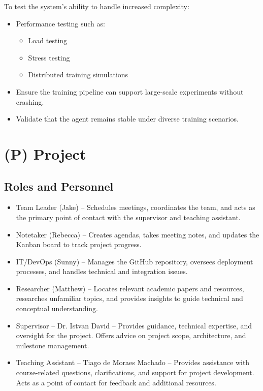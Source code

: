 \documentclass{article}
\begin{document}
To test the system’s ability to handle increased complexity:
\begin{itemize}
    \item Performance testing such as:
    \begin{itemize}
        \item Load testing
        \item Stress testing
        \item Distributed training simulations
    \end{itemize}
    \item Ensure the training pipeline can support large-scale experiments without crashing.
    \item Validate that the agent remains stable under diverse training scenarios.
\end{itemize}
\newpage{}


\section*{(P) Project}\label{sec:srs_project}
\renewcommand{\thesubsection}{P.\arabic{subsection}}
\setcounter{subsection}{0}

\subsection{Roles and Personnel}\label{subsec:roles}
\begin{itemize}
    \item {Team Leader (Jake)} – Schedules meetings, coordinates the team, and acts as the primary point of contact with the supervisor and teaching assistant.
    \item {Notetaker (Rebecca)} – Creates agendas, takes meeting notes, and updates the Kanban board to track project progress.
    \item {IT/DevOps (Sunny)} – Manages the GitHub repository, oversees deployment processes, and handles technical and integration issues.
    \item {Researcher (Matthew)} – Locates relevant academic papers and resources, researches unfamiliar topics, and provides insights to guide technical and conceptual understanding.
    \item {Supervisor – Dr. Istvan David} – Provides guidance, technical expertise, and oversight for the project. Offers advice on project scope, architecture, and milestone management.
    \item {Teaching Assistant – Tiago de Moraes Machado} – Provides assistance with course-related questions, clarifications, and support for project development. Acts as a point of contact for feedback and additional resources.
\end{itemize}
\end{document}
